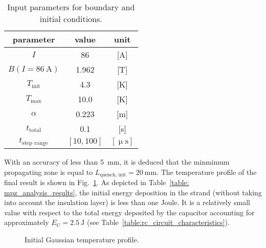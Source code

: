 \begin{table}[H]
    \caption{Input parameters for boundary and initial conditions.} 
    \vspace{-1.em} 
    \fontsize{10}{10}
    \selectfont 
    \renewcommand{\arraystretch}{1.5}
    \begin{center}
        \begin{tabular}{ ccc }  
        \hline
        parameter & value & unit \\
        \hline
        $I$ & 86 & [A] \\
        $B(I=86~\text{A})$ & 1.962 & [T] \\
        $T_\text{init}$ & 4.3 & [K] \\
        $T_\text{max}$ & 10.0 & [K] \\
        $\alpha$ & 0.223 & [m] \\   
        $t_\text{total}$ & 0.1 & [s] \\
        $t_\text{step range}$ & $[10, 100]$ & $[\upmu \text{s}]$ \\
        \hline 
        \end{tabular}
    \end{center}  
     \label{table: mpz_analysis_input_parameters} 
 \end{table}
 
With an accuracy of less than 5~mm, it is deduced that the minmimum propagating zone is equal to $L_\text{quench, init}=20~\text{mm}$. The temperature profile of the final result is shown in Fig.~\ref{fig: init_gauss_temp_distr_mpz}. As depicted in Table~\ref{table: mpz_analysis_results}, the initial energy deposition in the strand (without taking into account the insulation layer) is less than one Joule. It is a relatively small value with respect to the total energy deposited by the capacitor accounting for approximately $E_\text{C}=2.5~\text{J}$ (see Table~\ref{table:rc_circuit_characteristics}).
 
\begin{figure}[H]
    \centering
    \caption{Initial Gaussian temperature profile.}
    \label{fig: init_gauss_temp_distr_mpz}
\end{figure}

